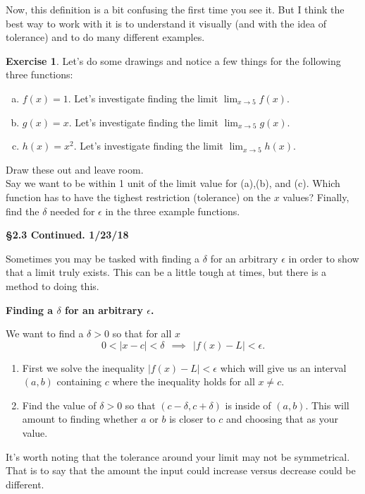 \documentclass[leqno]{article}
\theoremstyle{definition}
\newtheorem{exercise}{Exercise}[section]
\theoremstyle{remark}
\theoremstyle{theorem}
\begin{document}
Now, this definition is a bit confusing the first time you see it.  But I think the best way to work with it is to understand it visually (and with the idea of tolerance) and to do many different examples.

\begin{exercise}
Let's do some drawings and notice a few things for the following three functions:
\begin{enumerate}[(a)]
\item $f(x)=1$.  Let's investigate finding the limit $\lim_{x\to 5} f(x)$.
\item $g(x)=x$.  Let's investigate finding the limit $\lim_{x\to 5} g(x)$.
\item $h(x)=x^2$. Let's investigate finding the limit $\lim_{x\to 5} h(x)$.
\end{enumerate}
Draw these out and leave room. 
\vspace*{8cm}\\

Say we want to be within 1 unit of the limit value for (a),(b), and (c).  Which function has to have the tighest restriction (tolerance) on the $x$ values? Finally, find the $\delta$ needed for $\epsilon$ in the three example functions.
\vspace*{5cm}
\end{exercise}

\noindent \textbf{\Large{\S 2.3 Continued.  1/23/18}}

Sometimes you may be tasked with finding a $\delta$ for an arbitrary $\epsilon$ in order to show that a limit truly exists.  This can be a little tough at times, but there is a method to doing this.  

\noindent \textbf{Finding a $\delta$ for an arbitrary $\epsilon$.} 

We want to find a $\delta>0$ so that for all $x$
\[
0<|x-c|<\delta ~~ \implies ~~ |f(x)-L|<\epsilon.
\]
\begin{enumerate}[1.]
\item First we solve the inequality $|f(x)-L|<\epsilon$ which will give us an interval $(a,b)$ containing $c$ where the inequality holds for all $x\neq c$.
\item Find the value of $\delta>0$ so that $(c-\delta,c+\delta)$ is inside of $(a,b)$. This will amount to finding whether $a$ or $b$ is closer to $c$ and choosing that as your value.
\end{enumerate}

It's worth noting that the tolerance around your limit may not be symmetrical.  That is to say that the amount the input could increase versus decrease could be different.
\end{document}
